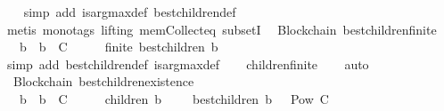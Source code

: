 \begin{isabellebody}
%
\isadelimproof
\ \ %
\endisadelimproof
%
\isatagproof
{}\isamarkupfalse%
\ {\isacharparenleft}simp\ add{\isacharcolon}\ is{\isacharunderscore}arg{\isacharunderscore}max{\isacharunderscore}def\ best{\isacharunderscore}children{\isacharunderscore}def{\isacharparenright}\isanewline
\ \ \isamarkupfalse%
\ {\isacharparenleft}metis\ {\isacharparenleft}mono{\isacharunderscore}tags{\isacharcomma}\ lifting{\isacharparenright}\ mem{\isacharunderscore}Collect{\isacharunderscore}eq\ subsetI{\isacharparenright}%
\endisatagproof
{\isafoldproof}%
%
\isadelimproof
\isanewline
%
\endisadelimproof
\isanewline
{}\isamarkupfalse%
\ {\isacharparenleft}\ Blockchain{\isacharparenright}\ best{\isacharunderscore}children{\isacharunderscore}finite\ {\isacharcolon}\isanewline
\ \ {\isachardoublequoteopen}{\isasymforall}\ b\ {\isasymsigma}{\isachardot}\ b\ {\isasymin}\ C\ {\isasymand}\ {\isasymsigma}\ {\isasymin}\ {\isasymSigma}\ {\isasymlongrightarrow}\ finite\ {\isacharparenleft}best{\isacharunderscore}children\ {\isacharparenleft}b{\isacharcomma}\ {\isasymsigma}{\isacharparenright}{\isacharparenright}{\isachardoublequoteclose}\isanewline
%
\isadelimproof
\ \ %
\endisadelimproof
%
\isatagproof
{}\isamarkupfalse%
\ {\isacharparenleft}simp\ add{\isacharcolon}\ best{\isacharunderscore}children{\isacharunderscore}def\ is{\isacharunderscore}arg{\isacharunderscore}max{\isacharunderscore}def{\isacharparenright}\isanewline
\ \ \isamarkupfalse%
\ children{\isacharunderscore}finite\isanewline
\ \ \isamarkupfalse%
\ auto%
\endisatagproof
{\isafoldproof}%
%
\isadelimproof
\isanewline
%
\endisadelimproof
\ \isanewline
{}\isamarkupfalse%
\ {\isacharparenleft}\ Blockchain{\isacharparenright}\ best{\isacharunderscore}children{\isacharunderscore}existence\ {\isacharcolon}\isanewline
\ \ {\isachardoublequoteopen}{\isasymforall}\ b\ {\isasymsigma}{\isachardot}\ b\ {\isasymin}\ C\ {\isasymand}\ {\isasymsigma}\ {\isasymin}\ {\isasymSigma}\ {\isasymlongrightarrow}\ children\ {\isacharparenleft}b{\isacharcomma}\ {\isasymsigma}{\isacharparenright}\ {\isasymnoteq}\ {\isasymemptyset}\ {\isasymlongrightarrow}\ best{\isacharunderscore}children\ {\isacharparenleft}b{\isacharcomma}\ {\isasymsigma}{\isacharparenright}\ {\isasymin}\ Pow\ C\ {\isacharminus}\ {\isacharbraceleft}{\isasymemptyset}{\isacharbraceright}{\isachardoublequoteclose}\ \ \ \ \isanewline
%
\isadelimproof
%
\endisadelimproof
%
\isatagproof
{}\isamarkupfalse%
\ {\isacharminus}\isanewline

\end{isabellebody}
